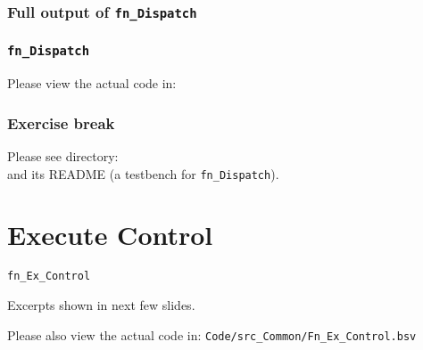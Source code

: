 
\begin{frame}[fragile]
\frametitle{Full output of {\tt fn\_Dispatch}}

\footnotesize


\end{frame}


\begin{frame}
\frametitle{{\tt fn\_Dispatch}}

\footnotesize

\begin{center}\large
 Please view the actual code in: 
\end{center}

\end{frame}


\begin{frame}
\frametitle{\EmojiExercise \hmm Exercise break}

Please see directory:  \\
and its README (a testbench for {\tt fn\_Dispatch}).

\end{frame}


\section{Execute Control}

\begin{frame}[fragile]

\begin{center}
  {\LARGE\tt fn\_Ex\_Control}

  \vspace{5ex}

  Excerpts shown in next few slides.

  Please also view the actual code in:
  {\tt Code/src\_Common/Fn\_Ex\_Control.bsv}

\end{center}

\end{frame}

